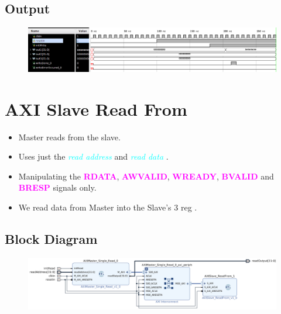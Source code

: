 \documentclass{article}
\newcommand{\chFormat}[1]{\emph{\textcolor{cyan}{#1}}}
\newcommand{\AXISignals}[1]{\textbf{\textcolor{magenta}{#1}}}
\begin{document}
\subsection{Output}
\begin{figure}[H]
    \centering
    \includegraphics[width=1\textwidth]{Resources/SlaveWriteTo3RegOutput.png}
\end{figure}



\section{AXI Slave Read From}
\begin{itemize}
    \item Master reads from the slave.
    \item Uses just the \chFormat{read address} and \chFormat{read data} .
    \item Manipulating the \AXISignals{RDATA}, \AXISignals{AWVALID}, \AXISignals{WREADY}, \AXISignals{BVALID} and \AXISignals{BRESP} signals only.
    \item We read data from Master into the Slave's 3 reg .
\end{itemize}
\subsection{Block Diagram}
\begin{figure}[H]
    \centering
    \includegraphics[width=1\textwidth]{Resources/SlaveReadFrom3Reg.png}
\end{figure}
\end{document}
